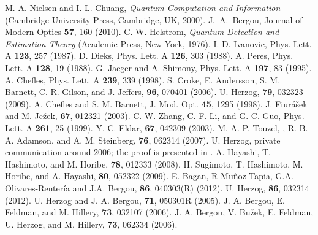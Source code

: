 \documentclass[aps,pra,twocolumn,eqsecnum,showpacs]{revtex4}
\begin{document}
\begin{thebibliography}{99}

     M. A. Nielsen and I. L. Chuang, \emph{Quantum Computation and Information} (Cambridge University Press, Cambridge, UK, 2000).
     J.\ A.\ Bergou, Journal of Modern Optics \textbf{57}, 160 (2010).
     C. W. Helstrom, \emph{Quantum Detection and Estimation Theory} (Academic Press, New York, 1976).
     I. D. Ivanovic, Phys. Lett. A \textbf{123}, 257 (1987).
     D. Dieks, Phys. Lett. A \textbf{126}, 303 (1988).
     A. Peres, Phys. Lett. A \textbf{128}, 19 (1988).
     G. Jaeger and A. Shimony, Phys. Lett. A \textbf{197}, 83 (1995).
     A. Chefles, Phys. Lett. A \textbf{239}, 339 (1998).
      S. Croke, E. Andersson, S. M. Barnett, C. R. Gilson, and J. Jeffers, \prl \textbf{96}, 070401 (2006).
     U. Herzog, \pra \textbf{79}, 032323 (2009).
     A. Chefles and S. M. Barnett, J. Mod. Opt. \textbf{45}, 1295 (1998).
     J. Fiur\'a\v{s}ek and M. Je\v{z}ek, \pra \textbf{67}, 012321 (2003).
     C.-W. Zhang, C.-F. Li, and G.-C. Guo, Phys. Lett. A \textbf{261}, 25 (1999).
     Y. C. Eldar, \pra \textbf{67}, 042309 (2003).
     M. A. P. Touzel, , R. B. A. Adamson, and A. M. Steinberg, \pra \textbf{76}, 062314 (2007).
     U. Herzog, private communication around 2006; the proof is presented in \cite{Herzog1}.
     A. Hayashi, T. Hashimoto, and M. Horibe, \pra \textbf{78}, 012333 (2008).
     H. Sugimoto, T. Hashimoto, M. Horibe, and A. Hayashi, \pra \textbf{80}, 052322 (2009).
      E. Bagan, R Mu\~{n}oz-Tapia, G.A. Olivares-Renter\'{i}a and J.A. Bergou, \pra \textbf{86}, 040303(R) (2012).
     U. Herzog, \pra \textbf{86}, 032314 (2012).
     U. Herzog and J. A. Bergou, \pra \textbf{71}, 050301R (2005).
     J. A. Bergou, E. Feldman, and M. Hillery, \pra \textbf{73}, 032107 (2006).
     J. A. Bergou, V. Bu\v{z}ek, E. Feldman, U. Herzog, and M. Hillery, \pra \textbf{73}, 062334 (2006).
     


\end{thebibliography}     
\end{document}
